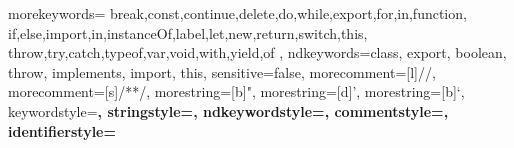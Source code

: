 \usepackage{textcomp}
\usepackage{xcolor}
\usepackage{listings}



 {
  morekeywords={
    break,const,continue,delete,do,while,export,for,in,function,
    if,else,import,in,instanceOf,label,let,new,return,switch,this,
    throw,try,catch,typeof,var,void,with,yield,of
  },
  ndkeywords={class, export, boolean, throw, implements, import, this},
  sensitive=false,
  morecomment=[l]{//},
  morecomment=[s]{/*}{*/},
  morestring=[b]",
  morestring=[d]',
  morestring=[b]`,
  keywordstyle=\color{pink}\bfseries,
  stringstyle=\color{yellow}\ttfamily,
  ndkeywordstyle=\color{blue}\bfseries,
  commentstyle=\color{grey}\ttfamily,
  identifierstyle=\color{black}
}

\lstset{
  frame=tb,
  framesep=5pt,
  extendedchars=true,
  basicstyle=\footnotesize\ttfamily,
  showstringspaces=false,
  numbers=left,
  numberstyle=\footnotesize,
  numbersep=9pt,
  tabsize=2,
  breaklines=true,
  showtabs=false,
  captionpos=b,
  aboveskip=\bigskipamount,
  belowskip=\bigskipamount,
  xleftmargin=5pt,
  xrightmargin=5pt
}

\renewcommand\lstlistlistingname{List of Listings}

